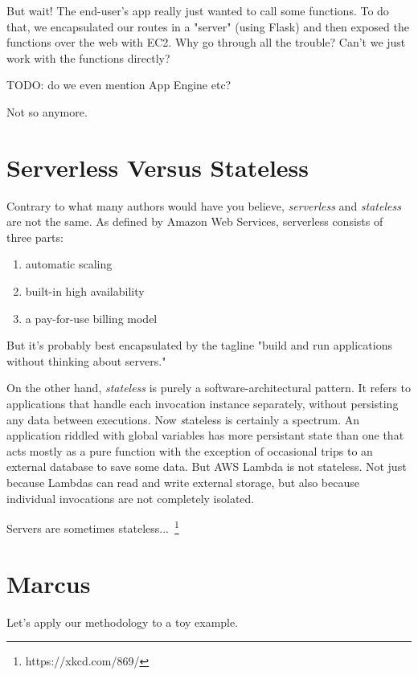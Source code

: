 \documentclass{article}
\newcommand{\term}[1]{\textit{#1}}
\newcommand{\newp}{\newline\indent}
\begin{document}
But wait!
The end-user's app really just wanted to call some functions.
To do that, we encapsulated our routes in a "server" (using Flask) and then exposed the functions over the web with EC2.
Why go through all the trouble?
Can't we just work with the functions directly?

TODO: do we even mention App Engine etc?

\newp Not so anymore.


\section{Serverless Versus Stateless}

Contrary to what many authors would have you believe, \term{serverless} and \term{stateless} are not the same.
As defined by Amazon Web Services, serverless consists of three parts:

\begin{enumerate}
    \item automatic scaling
    \item built-in high availability
    \item a pay-for-use billing model
\end{enumerate}

But it's probably best encapsulated by the tagline "build and run applications without thinking about servers."

On the other hand, \textit{stateless} is purely a software-architectural pattern.
It refers to applications that handle each invocation instance separately, without persisting any data between executions.
Now \term stateless is certainly a spectrum.
An application riddled with global variables has more persistant state than one that acts mostly as a pure function with the exception of occasional trips to an external database to save some data.
But AWS Lambda is not stateless.
Not just because Lambdas can read and write external storage, but also because individual invocations are not completely isolated.

Servers are sometimes stateless...~\footnote{https://xkcd.com/869/}

\section{Marcus}

Let's apply our methodology to a toy example.
\end{document}
